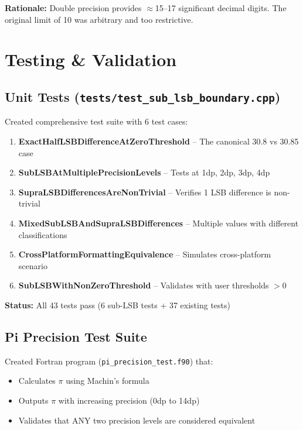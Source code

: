 \documentclass[11pt]{article}
\begin{document}
\textbf{Rationale:} Double precision provides $\approx$15--17 significant decimal digits. The original limit of 10 was arbitrary and too restrictive.

\section{Testing \& Validation}

\subsection{Unit Tests (\texttt{tests/test\_sub\_lsb\_boundary.cpp})}

Created comprehensive test suite with 6 test cases:

\begin{enumerate}
    \item \textbf{ExactHalfLSBDifferenceAtZeroThreshold} -- The canonical 30.8 vs 30.85 case
    \item \textbf{SubLSBAtMultiplePrecisionLevels} -- Tests at 1dp, 2dp, 3dp, 4dp
    \item \textbf{SupraLSBDifferencesAreNonTrivial} -- Verifies 1 LSB difference is non-trivial
    \item \textbf{MixedSubLSBAndSupraLSBDifferences} -- Multiple values with different classifications
    \item \textbf{CrossPlatformFormattingEquivalence} -- Simulates cross-platform scenario
    \item \textbf{SubLSBWithNonZeroThreshold} -- Validates with user thresholds $> 0$
\end{enumerate}

\textbf{Status:} All 43 tests pass (6 sub-LSB tests + 37 existing tests)

\subsection{Pi Precision Test Suite}

Created Fortran program (\texttt{pi\_precision\_test.f90}) that:

\begin{itemize}
    \item Calculates $\pi$ using Machin's formula
    \item Outputs $\pi$ with increasing precision (0dp to 14dp)
    \item Validates that ANY two precision levels are considered equivalent
\end{itemize}
\end{document}
